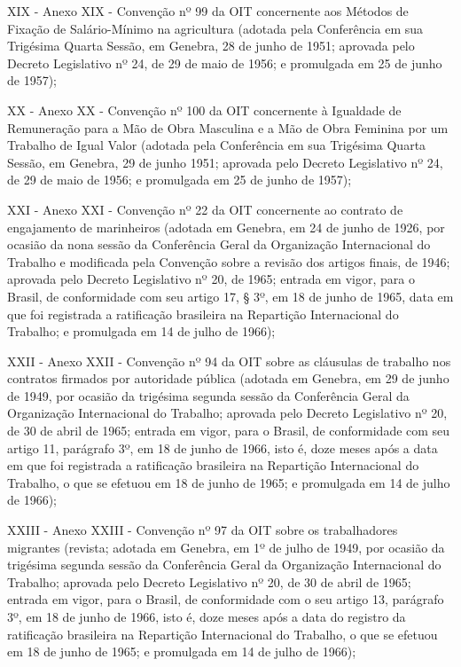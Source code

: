 \documentclass[
]{book}
\begin{document}
XIX - Anexo XIX - Convenção nº 99 da OIT concernente aos Métodos de Fixação de Salário-Mínimo na agricultura (adotada pela Conferência em sua Trigésima Quarta Sessão, em Genebra, 28 de junho de 1951; aprovada pelo Decreto Legislativo nº 24, de 29 de maio de 1956; e promulgada em 25 de junho de 1957);

XX - Anexo XX - Convenção nº 100 da OIT concernente à Igualdade de Remuneração para a Mão de Obra Masculina e a Mão de Obra Feminina por um Trabalho de Igual Valor (adotada pela Conferência em sua Trigésima Quarta Sessão, em Genebra, 29 de junho 1951; aprovada pelo Decreto Legislativo nº 24, de 29 de maio de 1956; e promulgada em 25 de junho de 1957);

XXI - Anexo XXI - Convenção nº 22 da OIT concernente ao contrato de engajamento de marinheiros (adotada em Genebra, em 24 de junho de 1926, por ocasião da nona sessão da Conferência Geral da Organização Internacional do Trabalho e modificada pela Convenção sobre a revisão dos artigos finais, de 1946; aprovada pelo Decreto Legislativo nº 20, de 1965; entrada em vigor, para o Brasil, de conformidade com seu artigo 17, § 3º, em 18 de junho de 1965, data em que foi registrada a ratificação brasileira na Repartição Internacional do Trabalho; e promulgada em 14 de julho de 1966);

XXII - Anexo XXII - Convenção nº 94 da OIT sobre as cláusulas de trabalho nos contratos firmados por autoridade pública (adotada em Genebra, em 29 de junho de 1949, por ocasião da trigésima segunda sessão da Conferência Geral da Organização Internacional do Trabalho; aprovada pelo Decreto Legislativo nº 20, de 30 de abril de 1965; entrada em vigor, para o Brasil, de conformidade com seu artigo 11, parágrafo 3º, em 18 de junho de 1966, isto é, doze meses após a data em que foi registrada a ratificação brasileira na Repartição Internacional do Trabalho, o que se efetuou em 18 de junho de 1965; e promulgada em 14 de julho de 1966);

XXIII - Anexo XXIII - Convenção nº 97 da OIT sobre os trabalhadores migrantes (revista; adotada em Genebra, em 1º de julho de 1949, por ocasião da trigésima segunda sessão da Conferência Geral da Organização Internacional do Trabalho; aprovada pelo Decreto Legislativo nº 20, de 30 de abril de 1965; entrada em vigor, para o Brasil, de conformidade com o seu artigo 13, parágrafo 3º, em 18 de junho de 1966, isto é, doze meses após a data do registro da ratificação brasileira na Repartição Internacional do Trabalho, o que se efetuou em 18 de junho de 1965; e promulgada em 14 de julho de 1966);
\end{document}
